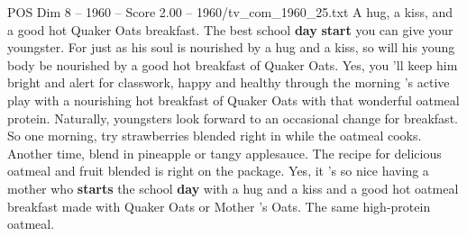 \begin{textsample}{POS Dim 8 – 1960 – Score 2.00 – 1960/tv\_com\_1960\_25.txt}  \label{ex:f8_pos_062}
A hug, a kiss, and a good hot Quaker Oats breakfast.
The best school \textbf{day} \textbf{start} you can give your youngster.
For just as his soul is nourished by a hug and a kiss, so will his young body be nourished by a good hot breakfast of Quaker Oats.
Yes, you 'll keep him bright and alert for classwork, happy and healthy through the morning 's active play with a nourishing hot breakfast of Quaker Oats with that wonderful oatmeal protein.
Naturally, youngsters look forward to an occasional change for breakfast.
So one morning, try strawberries blended right in while the oatmeal cooks.
Another time, blend in pineapple or tangy applesauce.
The recipe for delicious oatmeal and fruit blended is right on the package.
Yes, it 's so nice having a mother who \textbf{starts} the school \textbf{day} with a hug and a kiss and a good hot oatmeal breakfast made with Quaker Oats or Mother 's Oats.
The same high-protein oatmeal.

\end{textsample}
